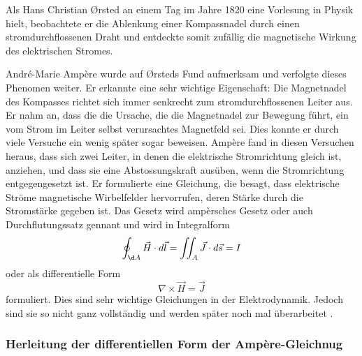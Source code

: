 Als Hans Christian Ørsted an einem Tag im Jahre 1820 eine Vorlesung in Physik hielt, beobachtete er die Ablenkung einer Kompassnadel durch einen stromdurchflossenen Draht und entdeckte somit zufällig die magnetische Wirkung des elektrischen Stromes.

André-Marie Ampère wurde auf Ørsteds Fund aufmerksam und verfolgte dieses Phenomen weiter.
Er erkannte eine sehr wichtige Eigenschaft: Die Magnetnadel des Kompasses richtet sich immer senkrecht zum stromdurchflossenen Leiter aus.
Er nahm an, dass die die Ursache, die die Magnetnadel zur Bewegung führt, ein vom Strom im Leiter selbst verursachtes Magnetfeld sei.
Dies konnte er durch viele Versuche ein wenig später sogar beweisen.
Ampère fand in diesen Versuchen heraus, dass sich zwei Leiter, in denen die elektrische Stromrichtung gleich ist, anziehen, und dass sie eine Abstossungskraft ausüben, wenn die Stromrichtung entgegengesetzt ist.
Er formulierte eine Gleichung, die besagt, dass elektrische Ströme magnetische Wirbelfelder hervorrufen, deren Stärke durch die Stromstärke gegeben ist.
Das Gesetz wird ampèrsches Gesetz oder auch Durchflutungssatz gennant und wird in Integralform
\begin{equation}
\label{maxwell:equasion:ampere}
\oint_{\d A}
\vec{H}
\cdot
d\vec{l}
=
\iint_{A}
\vec{J}
\cdot
d\vec{s}
=
I
\end{equation}
oder als differentielle Form
\[
\nabla
\times
\vec{H}
=
\vec{J}
\]
formuliert.
Dies sind sehr wichtige Gleichungen in der Elektrodynamik.
Jedoch sind sie so nicht ganz vollständig und werden später noch mal überarbeitet \cite{maxwell:Hans_Christian_Ørsted}\cite{maxwell:André-Marie_Ampère}.

\subsubsection{Herleitung der differentiellen Form der Ampère-Gleichnug}

